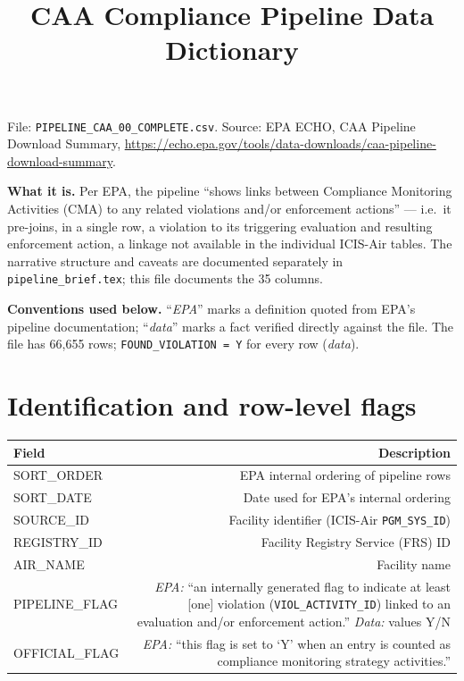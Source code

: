 \documentclass[11pt]{article}
\title{CAA Compliance Pipeline Data Dictionary}
\author{}
\date{}
\begin{document}
\maketitle

\noindent File: \texttt{PIPELINE\_CAA\_00\_COMPLETE.csv}. Source: EPA ECHO, CAA Pipeline Download
Summary, \url{https://echo.epa.gov/tools/data-downloads/caa-pipeline-download-summary}.

\medskip
\noindent\textbf{What it is.} Per EPA, the pipeline ``shows links between Compliance Monitoring
Activities (CMA) to any related violations and/or enforcement actions'' --- i.e.\ it pre-joins, in a
single row, a violation to its triggering evaluation and resulting enforcement action, a linkage not
available in the individual ICIS-Air tables. The narrative structure and caveats are documented
separately in \texttt{pipeline\_brief.tex}; this file documents the 35 columns.

\medskip
\noindent\textbf{Conventions used below.} ``\emph{EPA}'' marks a definition quoted from EPA's pipeline
documentation; ``\emph{data}'' marks a fact verified directly against the file. The file has 66,655 rows;
\texttt{FOUND\_VIOLATION = Y} for every row (\emph{data}).

\section*{Identification and row-level flags}
\begin{longtable}{F D}
\toprule
Field & Description \\ \midrule \endhead
SORT\_ORDER & EPA internal ordering of pipeline rows \\
SORT\_DATE & Date used for EPA's internal ordering \\
SOURCE\_ID & Facility identifier (ICIS-Air \texttt{PGM\_SYS\_ID}) \\
REGISTRY\_ID & Facility Registry Service (FRS) ID \\
AIR\_NAME & Facility name \\
PIPELINE\_FLAG & \emph{EPA:} ``an internally generated flag to indicate at least [one] violation
(\texttt{VIOL\_ACTIVITY\_ID}) linked to an evaluation and/or enforcement action.'' \emph{Data:} values
Y/N \\
OFFICIAL\_FLAG & \emph{EPA:} ``this flag is set to `Y' when an entry is counted as compliance monitoring
strategy activities.'' \\
\bottomrule
\end{longtable}
\end{document}
